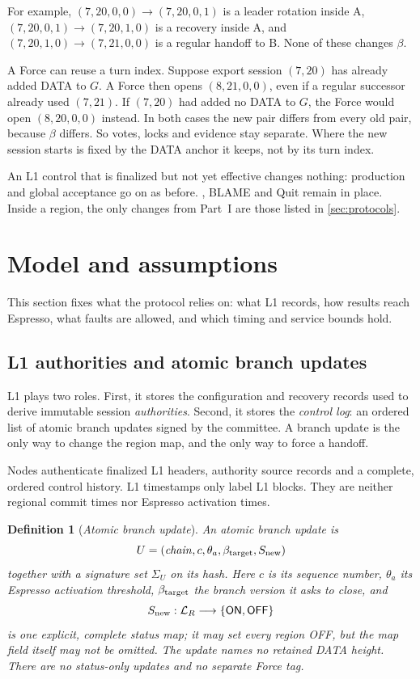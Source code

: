 \documentclass[11pt,a4paper]{article}
\newcommand{\tagg}[1]{\ensuremath{\mathsf{#1}}}
\newcommand{\defterm}[1]{\textcolor{rrBlue}{\textit{#1}}}
\newtheorem{definition}{Definition}[section]
\newcounter{protocol}
\begin{document}
For example, $(7,20,0,0)\to(7,20,0,1)$ is a leader rotation inside A,
$(7,20,0,1)\to(7,20,1,0)$ is a recovery inside A, and
$(7,20,1,0)\to(7,21,0,0)$ is a regular handoff to B. None of these
changes $\beta$.

A Force can reuse a turn index. Suppose export session $(7,20)$ has
already added DATA to $G$. A Force then opens $(8,21,0,0)$, even if
a regular successor already used $(7,21)$. If $(7,20)$ had added no
DATA to $G$, the Force would open $(8,20,0,0)$ instead. In both cases
the new pair differs from every old pair, because $\beta$ differs. So
votes, locks and evidence stay separate. Where the new session starts is
fixed by the DATA anchor it keeps, not by its turn index.

An L1 control that is finalized but not yet effective changes nothing:
production and global acceptance go on as before.
, BLAME and Quit remain in place. Inside a region,
the only changes from Part~I are those listed in \cref{sec:protocols}.


\section{Model and assumptions}
\label{sec:model}
This section fixes what the protocol relies on: what L1 records, how
results reach Espresso, what faults are allowed, and which timing and
service bounds hold.

\subsection{L1 authorities and atomic branch updates}
\label{sec:l1}
\label{sec:runtime-controls}
L1 plays two roles. First, it stores the configuration and recovery
records used to derive immutable session \emph{authorities}. Second,
it stores the \emph{control log}: an ordered list of
atomic branch updates signed by the committee. A branch update is the
only way to change the region map, and the only way to force a
handoff.

Nodes authenticate finalized L1 headers, authority source records and a
complete, ordered control history. L1 timestamps only label L1 blocks. They are
neither regional commit times nor Espresso activation times.

\begin{definition}[\defterm{Atomic branch update}]
\label{def:control-update}
An atomic branch update is
\[
 U=(\mathit{chain},c,\theta_a,\beta_{\rm target},S_{\rm new})
\]
together with a signature set $\Sigma_U$ on its hash. Here $c$ is its
sequence number, $\theta_a$ its Espresso activation threshold,
$\beta_{\rm target}$ the branch version it asks to close, and
\[
 S_{\rm new}:\mathcal L_R\longrightarrow
 \{\tagg{ON},\tagg{OFF}\}
\]
is one explicit, complete status map; it may set every region OFF, but
the map field itself may not be omitted. The update names no retained
DATA height. There are no status-only updates and no separate Force tag.
\end{definition}
\end{document}
